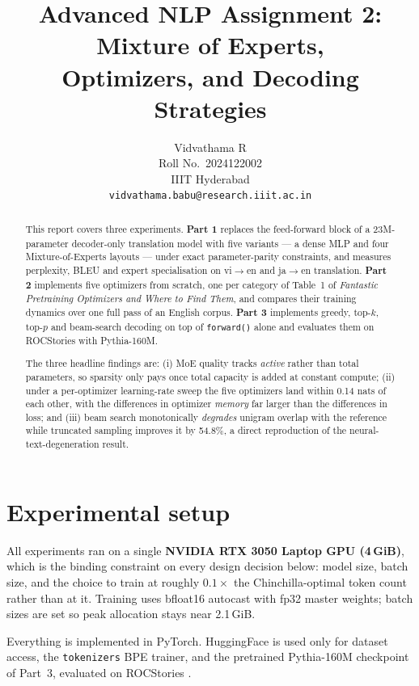 \documentclass[11pt]{article}
\title{Advanced NLP Assignment 2: Mixture of Experts,\\
Optimizers, and Decoding Strategies}
\author{Vidvathama R \\
  Roll No.\ 2024122002 \\
  IIIT Hyderabad \\
  \texttt{vidvathama.babu@research.iiit.ac.in}}
\begin{document}
\maketitle

\begin{abstract}
This report covers three experiments. \textbf{Part 1} replaces the feed-forward
block of a 23M-parameter decoder-only translation model with five variants --- a
dense MLP and four Mixture-of-Experts layouts --- under exact parameter-parity
constraints, and measures perplexity, BLEU and expert specialisation on
vi$\rightarrow$en and ja$\rightarrow$en translation. \textbf{Part 2} implements
five optimizers from scratch, one per category of Table~1 of \emph{Fantastic
Pretraining Optimizers and Where to Find Them}, and compares their training
dynamics over one full pass of an English corpus. \textbf{Part 3} implements
greedy, top-$k$, top-$p$ and beam-search decoding on top of \texttt{forward()}
alone and evaluates them on ROCStories with Pythia-160M.

The three headline findings are: (i) MoE quality tracks \emph{active} rather than
total parameters, so sparsity only pays once total capacity is added at constant
compute; (ii) under a per-optimizer learning-rate sweep the five optimizers land
within 0.14 nats of each other, with the differences in optimizer \emph{memory}
far larger than the differences in loss; and (iii) beam search monotonically
\emph{degrades} unigram overlap with the reference while truncated sampling
improves it by 54.8\%, a direct reproduction of the neural-text-degeneration
result.
\end{abstract}

\section{Experimental setup}

All experiments ran on a single \textbf{NVIDIA RTX 3050 Laptop GPU (4\,GiB)},
which is the binding constraint on every design decision below: model size,
batch size, and the choice to train at roughly $0.1\times$ the Chinchilla-optimal
token count rather than at it. Training uses bfloat16 autocast with fp32 master
weights; batch sizes are set so peak allocation stays near 2.1\,GiB.

Everything is implemented in PyTorch. HuggingFace is used only for dataset
access, the \texttt{tokenizers} BPE trainer, and the pretrained Pythia-160M
checkpoint \citep{biderman2023pythia} of Part~3, evaluated on ROCStories
\citep{mostafazadeh2016corpus}.
\end{document}
